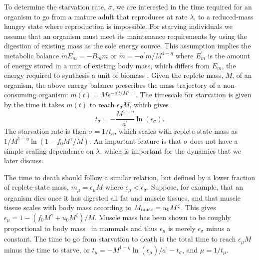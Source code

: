 \documentclass[twocolumn,preprintnumbers,amsmath,amssymb,superscriptaddress]{revtex4}
\begin{document}
{To determine the starvation rate, $\sigma$, we are interested in the time
required for an organism to go from a mature adult that reproduces at rate
$\lambda$, to a reduced-mass hungry state where reproduction is impossible.
For starving individuals we assume that an organism must meet its maintenance
requirements by using the digestion of existing mass as the sole energy
source.  This assumption implies the metabolic balance
$\dot{m}E_{m}^{\prime}=-B_{m}m$ or $\dot{m}=-a^{\prime}m/M^{1-\eta}$
where $E_{m}^{\prime}$ is the amount of energy stored in a unit of existing
body mass, which differs from $E_{m}$, the energy required to
synthesis a unit of biomass \citep{hou}. Given the replete mass, $M$, of an organism, the
above energy balance prescribes the mass trajectory of a non-consuming
organism: $m\left(t\right)=Me^{-a^{\prime}t/M^{1-\eta}}$.
The timescale for starvation is
given by the time it takes $m(t)$ to reach $\epsilon_{\sigma} M$, which gives
\begin{equation}
\label{eq:sigma}
t_{\sigma}=-\frac{M^{1-\eta}}{a^{\prime}}\ln\left(\epsilon_{\sigma}\right).
\end{equation}
The starvation rate is then $\sigma=1/t_{\sigma}$, which scales with
replete-state mass as $1/M^{1-\eta}\ln\left(1-f_{0}M^{\gamma}/M\right)$.  An important
feature is that $\sigma$ does not have a simple scaling dependence on
$\lambda$, which is important for the dynamics that we
later discuss.

The time to death should follow a similar relation, but defined by a lower
fraction of replete-state mass, $m_{\mu}=\epsilon_{\mu} M$ where $\epsilon_\mu < \epsilon_\sigma$.
Suppose, for example, that an organism dies once it has digested all fat and
muscle tissues, and that muscle tissue scales with body mass according to
$M_{\rm musc}=u_{0}M^{\zeta}$.  This gives
$\epsilon_{\mu}=1-\left(f_{0}M^{\gamma}+u_{0}M^{\zeta}\right)/M$. Muscle
mass has been shown to be roughly proportional to body mass~\citep{Folland:2008ij} in
mammals and thus $\epsilon_{\mu}$ is merely $\epsilon_{\sigma}$ minus a constant. The time to go from starvation to death is the total time to reach $\epsilon_{\mu}M$ minus the time to starve, or $t_{\mu}=-M^{1-\eta}\ln\left(\epsilon_{\mu}\right)/a^{\prime}-t_{\sigma}$,
and $\mu=1/t_{\mu}$.
}
\end{document}
